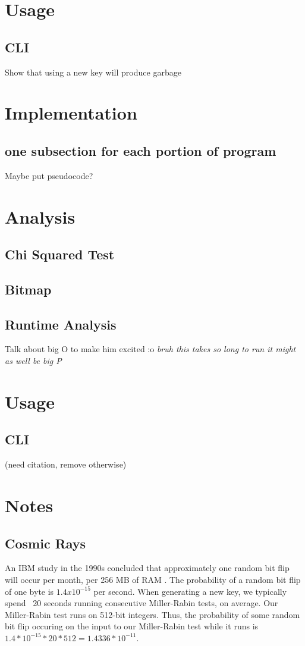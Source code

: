 \documentclass{article}
\begin{document}
\section{Usage}
\subsection{CLI}
Show that using a new key will produce garbage

\section{Implementation}
\subsection{one subsection for each portion of program}
Maybe put pseudocode?


\section{Analysis}
\subsection{Chi Squared Test}
\subsection{Bitmap}
\subsection{Runtime Analysis}
Talk about big O to make him excited :o \textit{bruh this takes so long to run it might as well be big P}


\section{Usage}
\subsection{CLI}(need citation, remove otherwise)

\section{Notes}
\subsection{Cosmic Rays}
An IBM study in the 1990s concluded that approximately one random bit flip will occur per month, per 256 MB of RAM \cite{cosmic}. The probability of a random bit flip of one byte is $1.4 x 10^{-15}$ per second. When generating a new key, we typically spend ~20 seconds running consecutive Miller-Rabin tests, on average. Our Miller-Rabin test runs on 512-bit integers. Thus, the probability of some random bit flip occuring on the input to our Miller-Rabin test while it runs is $1.4 * 10^{-15} * 20 * 512 = 1.4336 * 10^{-11}$.
\end{document}
